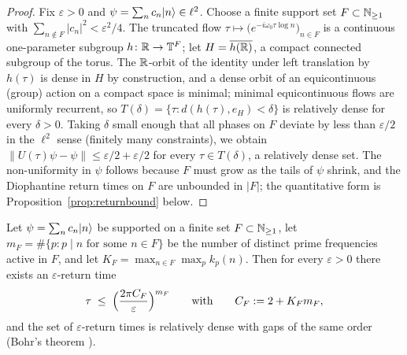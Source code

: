 \begin{proof}
Fix $\varepsilon>0$ and $\psi=\sum_{n}c_{n}\lvert n\rangle\in\ell^{2}$. Choose a finite support set
$F\subset\mathbb{N}_{\geq1}$ with $\sum_{n\notin F}|c_{n}|^{2}<\varepsilon^{2}/4$. The truncated
flow $\tau\mapsto\bigl(e^{-i\omega_{0}\tau\log n}\bigr)_{n\in F}$ is a continuous
one-parameter subgroup $h\colon\mathbb{R}\to\mathbb{T}^{F}$; let
$H=\overline{h(\mathbb{R})}$, a compact connected subgroup of the torus. The $\mathbb{R}$-orbit of the
identity under left translation by $h(\tau)$ is dense in $H$ by construction, and a dense
orbit of an equicontinuous (group) action on a compact space is minimal; minimal
equicontinuous flows are uniformly recurrent, so
$T(\delta)=\{\tau:d(h(\tau),e_{H})<\delta\}$ is relatively dense for every $\delta>0$.
Taking $\delta$ small enough that all phases on $F$ deviate by less than $\varepsilon/2$
in the $\ell^{2}$ sense (finitely many constraints), we obtain
$\|U(\tau)\psi-\psi\|\leq\varepsilon/2+\varepsilon/2$ for every $\tau\in T(\delta)$, a
relatively dense set. The non-uniformity in $\psi$ follows because $F$ must grow as the
tails of $\psi$ shrink, and the Diophantine return times on $F$ are unbounded in $|F|$; the
quantitative form is Proposition~\ref{prop:returnbound} below.
\end{proof}

\begin{proposition}\label{prop:returnbound}
Let $\psi=\sum_{n}c_{n}\lvert n\rangle$ be supported on a finite set $F\subset\mathbb{N}_{\geq1}$, let
$m_{F}=\#\{p: p\mid n \text{ for some } n\in F\}$ be the number of distinct prime
frequencies active in $F$, and let $K_{F}=\max_{n\in F}\max_{p}k_{p}(n)$. Then for every
$\varepsilon>0$ there exists an $\varepsilon$-return time
\begin{equation}\label{eq:returnbound}
\tau\;\leq\;\Bigl(\frac{2\pi C_{F}}{\varepsilon}\Bigr)^{m_{F}}
\qquad\text{with}\qquad C_{F}:=2+K_{F}m_{F},
\end{equation}
and the set of $\varepsilon$-return times is relatively dense with gaps of the same order
(Bohr's theorem \cite{besicovitch1932}).
\end{proposition}

